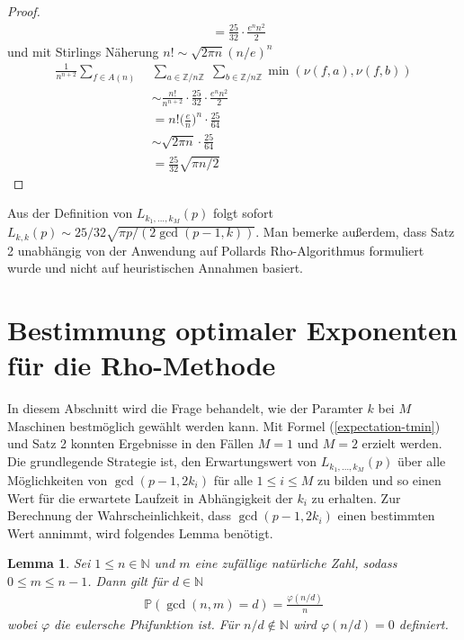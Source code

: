 \documentclass[a4paper, 10pt, ngerman]{article}
\newcommand{\N}{\mathbb{N}}
\newcommand{\Z}{\mathbb{Z}}
\newtheorem{lemma}{Lemma}
\begin{document}
\begin{proof}
\begin{align*}
         & = \frac {25} {32} \cdot \frac {e^n n^2} {2}
    \end{align*}
    und mit Stirlings Näherung $n! \sim \sqrt{2\pi n} (n/e)^n$
    \begin{align*}
        \frac 1 {n^{n + 2}} \sum_{f \in A(n)} \;
         & \sum_{a \in \Z/n\Z} \; \sum_{b \in \Z/n\Z} \min(\nu(f, a), \nu(f, b))    \\
         & \sim \frac {n!}{n^{n + 2}} \cdot \frac {25} {32} \cdot \frac {e^n n^2} 2 \\
         & = n! \bigg (\frac {e} {n} \bigg )^n \cdot \frac {25} {64}                \\
         & \sim \sqrt {2 \pi n} \cdot \frac {25}{64}                                \\
         & = \frac {25} {32} \sqrt{\pi n/2}
    \end{align*}
\end{proof}

\noindent Aus der Definition von $L_{k_1, \dots, k_M}(p)$ folgt sofort $L_{k, k}(p) \sim 25/32 \sqrt{\pi p / (2\gcd(p - 1, k))}$. Man bemerke außerdem, dass Satz 2 unabhängig von der Anwendung auf Pollards Rho-Algorithmus formuliert wurde und nicht auf heuristischen Annahmen basiert.

\section{Bestimmung optimaler Exponenten für die Rho-Methode}\label{sec:optimal-k}

In diesem Abschnitt wird die Frage behandelt, wie der Paramter $k$ bei $M$ Maschinen bestmöglich gewählt werden kann. Mit Formel (\ref{expectation-tmin}) und Satz 2 konnten Ergebnisse in den Fällen $M = 1$ und $M = 2$ erzielt werden. Die grundlegende Strategie ist, den Erwartungswert von $L_{k_1, \dots, k_M}(p)$ über alle Möglichkeiten von $\gcd(p - 1, 2k_i)$ für alle $1 \le i \le M$ zu bilden und so einen Wert für die erwartete Laufzeit in Abhängigkeit der $k_i$ zu erhalten. Zur Berechnung der Wahrscheinlichkeit, dass $\gcd(p - 1, 2k_i)$ einen bestimmten Wert annimmt, wird folgendes Lemma benötigt.

\begin{lemma}
    Sei $1 \le n \in \N$ und $m$ eine zufällige natürliche Zahl, sodass $0 \le m \le n - 1$. Dann gilt für $d \in \N$
    \begin{align*}
        \mathbb{P}(\gcd(n, m) = d) = \frac {\varphi(n / d)} n
    \end{align*}
    wobei $\varphi$ die eulersche Phifunktion ist. Für $n/d \notin \N$ wird $\varphi(n/d) = 0$ definiert.
\end{lemma}
\end{document}
